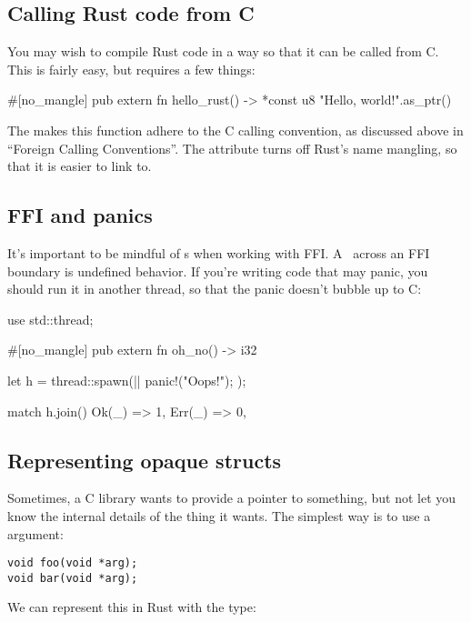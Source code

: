 \subsection*{Calling Rust code from C}

You may wish to compile Rust code in a way so that it can be called from C. This is fairly easy, but requires a few things:

\begin{rustc}
#[no_mangle]
pub extern fn hello_rust() -> *const u8 {
    "Hello, world!\0".as_ptr()
}
\end{rustc}

The  makes this function adhere to the C calling convention, as discussed above in \enquote{Foreign Calling 
Conventions}. The  attribute turns off Rust's name mangling, so that it is easier to link to.

\subsection*{FFI and panics}

It’s important to be mindful of s when working with FFI. A \panic\ across an FFI boundary is undefined behavior. 
If you’re writing code that may panic, you should run it in another thread, so that the panic doesn’t bubble up to C:

\begin{rustc}
use std::thread;

#[no_mangle]
pub extern fn oh_no() -> i32 {
    let h = thread::spawn(|| {
        panic!("Oops!");
    });

    match h.join() {
        Ok(_) => 1,
        Err(_) => 0,
    }
}
\end{rustc}

\subsection*{Representing opaque structs}

Sometimes, a C library wants to provide a pointer to something, but not let you know the internal details of the thing it 
wants. The simplest way is to use a  argument:

\begin{verbatim}
void foo(void *arg);
void bar(void *arg);
\end{verbatim}

We can represent this in Rust with the  type:

